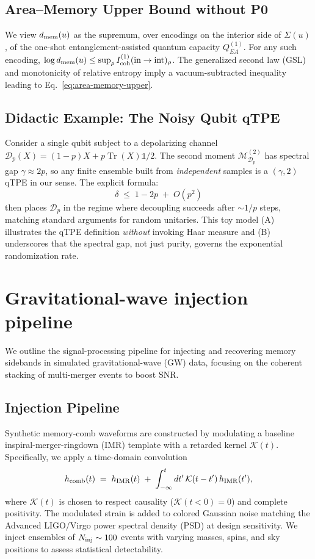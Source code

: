 \documentclass[11pt,a4paper]{article}
\newcommand{\Tr}{\operatorname{Tr}}
\theoremstyle{plain}
\theoremstyle{definition}
\theoremstyle{remark}
\begin{document}
\subsection{Area--Memory Upper Bound without P0}
We view $d_{\rm mem}(u)$ as the supremum, over encodings on the interior side of $\Sigma(u)$, of the one-shot entanglement-assisted quantum capacity $Q^{(1)}_{EA}$. For any such encoding, $\log d_{\rm mem}(u) \le \sup_\rho I^{(1)}_{\rm coh}(\text{in}\to\text{int})_\rho$. The generalized second law (GSL) and monotonicity of relative entropy imply a vacuum-subtracted inequality leading to Eq.~\eqref{eq:area-memory-upper}.

\subsection{Didactic Example: The Noisy Qubit qTPE}
\label{app:qtpe-didactic}
Consider a single qubit subject to a depolarizing channel $\mathcal{D}_p(X) = (1-p)X + p\Tr(X)\mathbb{1}/2$. The second moment $\mathcal{M}^{(2)}_{\mathcal{D}_p}$ has spectral gap $\gamma \approx 2p$, so any finite ensemble built from \textit{independent} samples is a $(\gamma,2)$ qTPE in our sense. The explicit formula:
\[
\delta \;\le\; 1 - 2p \;+\; O(p^2)
\]
then places $\mathcal{D}_p$ in the regime where decoupling succeeds after $\sim 1/p$ steps, matching standard arguments for random unitaries. This toy model (A) illustrates the qTPE definition \textit{without} invoking Haar measure and (B) underscores that the spectral gap, not just purity, governs the exponential randomization rate.


\section{Gravitational-wave injection pipeline}
We outline the signal-processing pipeline for injecting and recovering memory sidebands in simulated gravitational-wave (GW) data, focusing on the coherent stacking of multi-merger events to boost SNR.
\subsection{Injection Pipeline}
Synthetic memory-comb waveforms are constructed by modulating a baseline inspiral-merger-ringdown (IMR) template with a retarded kernel $\mathcal{K}(t)$. Specifically, we apply a time-domain convolution
\begin{equation}
h_{\rm comb}(t)\;=\;h_{\rm IMR}(t)\;+\;\int_{-\infty}^t dt'\,\mathcal{K}(t-t')\,h_{\rm IMR}(t'),
\end{equation}
where $\mathcal{K}(t)$ is chosen to respect causality ($\mathcal{K}(t<0)=0$) and complete positivity. The modulated strain is added to colored Gaussian noise matching the Advanced LIGO/Virgo power spectral density (PSD) at design sensitivity. We inject ensembles of $N_{\rm inj}\sim 100$ events with varying masses, spins, and sky positions to assess statistical detectability.
\end{document}
